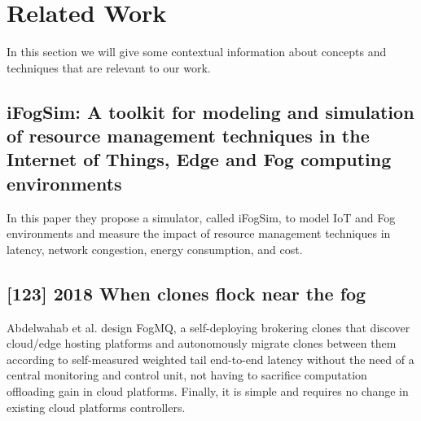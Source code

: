 \vfill
\pagebreak
\section{Related Work}
\label{sec:RelatedWork}

In this section we will give some contextual information about concepts and techniques that are relevant to our work.

\subsection{iFogSim: A toolkit for modeling and simulation of resource management techniques in the Internet of Things, Edge and Fog computing environments}
\label{subsec:paper01} \cite{gupta2017ifogsim}
In this paper they propose a simulator, called iFogSim, to model IoT and Fog environments and measure the impact of resource management techniques in latency, network congestion, energy consumption, and cost.

\subsection{[123] 2018 When clones flock near the fog}
\label{subsec:paper02}
Abdelwahab et al. \cite{abdelwahab2018clones} design FogMQ, a self-deploying brokering clones that discover cloud/edge hosting platforms and autonomously migrate clones between them according to self-measured weighted tail end-to-end latency without the need of a central monitoring and control unit, not having to sacrifice computation offloading gain in cloud platforms. Finally, it is simple and requires no change in existing cloud platforms controllers.

